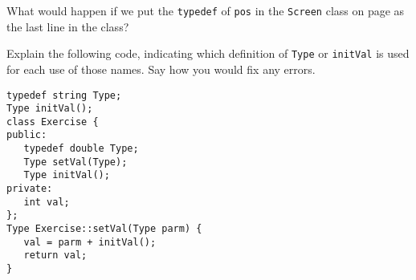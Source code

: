 %
%
\begin{question}
What would happen if we put the \verb|typedef| of \verb|pos| in the
\verb|Screen| class on page \pageref{lst:normal block-scope name lookup inside member definitions} as the last line in the class?
\end{question}

\begin{question}
Explain the following code, indicating which definition of
\verb|Type| or \verb|initVal| is used for each use of those names. Say how you would
fix any errors.
\begin{lstlisting}
typedef string Type;
Type initVal();
class Exercise {
public:
   typedef double Type;
   Type setVal(Type);
   Type initVal();
private:
   int val;
};
Type Exercise::setVal(Type parm) {
   val = parm + initVal();
   return val;
}
\end{lstlisting}
\end{question}
